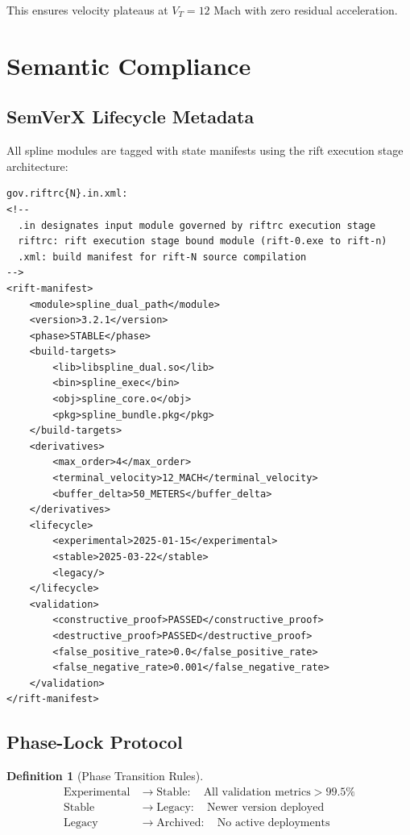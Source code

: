 \documentclass[11pt,a4paper]{article}
\theoremstyle{definition}
\newtheorem{definition}{Definition}[section]
\theoremstyle{plain}
\newcommand{\mach}{\text{ Mach}}
\begin{document}
This ensures velocity plateaus at $V_T = 12\mach$ with zero residual acceleration.

\section{Semantic Compliance}

\subsection{SemVerX Lifecycle Metadata}

All spline modules are tagged with state manifests using the rift execution stage architecture:

\begin{verbatim}
gov.riftrc{N}.in.xml:
<!-- 
  .in designates input module governed by riftrc execution stage
  riftrc: rift execution stage bound module (rift-0.exe to rift-n)
  .xml: build manifest for rift-N source compilation
-->
<rift-manifest>
    <module>spline_dual_path</module>
    <version>3.2.1</version>
    <phase>STABLE</phase>
    <build-targets>
        <lib>libspline_dual.so</lib>
        <bin>spline_exec</bin>
        <obj>spline_core.o</obj>
        <pkg>spline_bundle.pkg</pkg>
    </build-targets>
    <derivatives>
        <max_order>4</max_order>
        <terminal_velocity>12_MACH</terminal_velocity>
        <buffer_delta>50_METERS</buffer_delta>
    </derivatives>
    <lifecycle>
        <experimental>2025-01-15</experimental>
        <stable>2025-03-22</stable>
        <legacy/>
    </lifecycle>
    <validation>
        <constructive_proof>PASSED</constructive_proof>
        <destructive_proof>PASSED</destructive_proof>
        <false_positive_rate>0.0</false_positive_rate>
        <false_negative_rate>0.001</false_negative_rate>
    </validation>
</rift-manifest>
\end{verbatim}

\subsection{Phase-Lock Protocol}

\begin{definition}[Phase Transition Rules]
\begin{align}
\text{Experimental} &\rightarrow \text{Stable}: \quad \text{All validation metrics} > 99.5\% \\
\text{Stable} &\rightarrow \text{Legacy}: \quad \text{Newer version deployed} \\
\text{Legacy} &\rightarrow \text{Archived}: \quad \text{No active deployments}
\end{align}
\end{definition}
\end{document}
